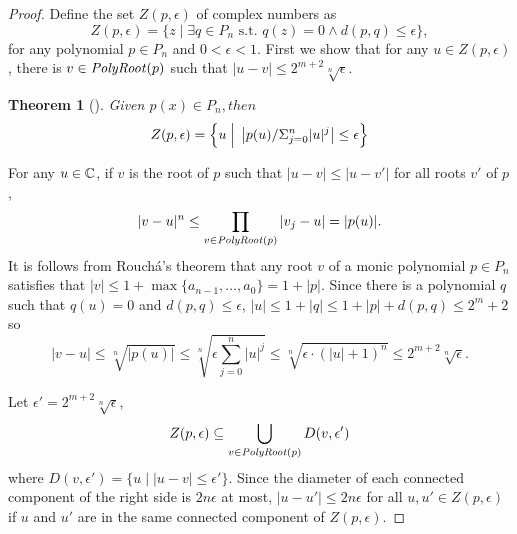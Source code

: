 \documentclass{article}
\newtheorem{theorem}{Theorem}[section]
\theoremstyle{definition}
\theoremstyle{remark}
\begin{document}
\begin{proof}
Define the set $Z(p, \epsilon)$ of complex numbers as
\begin{equation}
 Z(p, \epsilon)
 = 
  \{z \mid \exists q \in P_n \text{ s.t. } q(z) = 0 \wedge d(p, q) \le \epsilon\},
\end{equation}
for any polynomial $p \in P_n$ and $0 < \epsilon < 1$.
First we show that for any $u \in Z(p, \epsilon)$, there is $v \in \mathit{PolyRoot}(p)$ such that $|u - v| \le 2^{m+2}\sqrt[n]{\epsilon}$.
\begin{theorem} 
[{\cite[Theorem 1]{mosier1986root}}]
\label{theorem: root neighborhoods 1}
 Given $p(x) \in P_n, then$
 \begin{equation}
  Z(p, \epsilon) = \left\{u \;\Big{|}\;  \left| p(u) / \Sigma_{j=0}^n |u|^j \right| \le \epsilon \right\}
 \end{equation}
\end{theorem}
For any $u \in \mathbb C$, if $v$ is the root of $p$ such that 
$|u - v| \le |u - v'|$ for all roots $v'$ of $p$,
\begin{equation}
 |v - u|^n
 \le \prod_{v \in \mathit{PolyRoot}(p)} |v_j - u|
 = |p(u)|.
\end{equation}
It is follows from  Rouch\'a's theorem that
any root $v$ of a monic polynomial $p \in P_n$ satisfies that
$|v| \le 1 + \max\{a_{n-1}, \dots, a_0\} = 1 + |p|$.
Since there is a polynomial $q$ such that $q(u)=0$ and $d(p, q) \le \epsilon$,
$|u| \le 1+|q| \le 1 + |p| + d(p, q) \le 2^m + 2$ so
\begin{equation}
 |v - u|
 \le
 \sqrt[n]{|p(u)|}
 \le
 \sqrt[n]{\epsilon \sum_{j=0}^n |u|^j}
 \le
 \sqrt[n]{\epsilon \cdot (|u|+1)^n}
 \le
 2^{m+2} \sqrt[n]{\epsilon}.
\end{equation}


Let $\epsilon' = 2^{m+2} \sqrt[n]{\epsilon}$,
\begin{equation}
 Z(p, \epsilon) \subseteq \bigcup_{v \in \mathit{PolyRoot}(p)} D(v, \epsilon')
\end{equation}
where $D(v, \epsilon') = \{u \mid |u - v| \le \epsilon'\}$.
Since the diameter of each connected component of the right side 
is $2n\epsilon$ at most, $|u - u'| \le 2n\epsilon$ for all 
$u, u' \in Z(p, \epsilon)$ if $u$ and $u'$ are in the same connected component
of $Z(p, \epsilon)$.


\end{proof}
\end{document}
